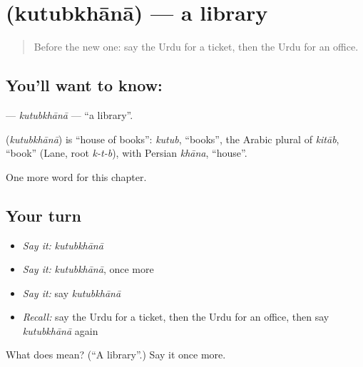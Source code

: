 \section[\texorpdfstring{\ur{کتب} \ur{خانہ} (kutubkhānā)}{کتب خانہ (kutubkhānā)}]{  (kutubkhānā) — a library}

\label{lesson:UR-C102-kutubkhana}



\begin{quote}
Before the new one: say the Urdu for a ticket, then the Urdu for an office.
\end{quote}

\subsection*{You'll want to know:  }
\textbf{ } — \emph{kutubkhānā} — \textquotedblleft{}a library\textquotedblright{}.

\begin{cousinweb}
\textbf{ } (\emph{kutubkhānā}) is \textquotedblleft{}house of books\textquotedblright{}: \emph{kutub}, \textquotedblleft{}books\textquotedblright{}, the Arabic plural of \emph{kitāb}, \textquotedblleft{}book\textquotedblright{} (Lane, root \emph{k-t-b}), with Persian \emph{khāna}, \textquotedblleft{}house\textquotedblright{}.
\end{cousinweb}

\begin{grammarlens}[title={What you've built}]
One more word for this chapter.
\end{grammarlens}

\subsection*{Your turn}
\begin{itemize}
\raggedright
  \item \emph{Say it:} \emph{kutubkhānā}
  \item \emph{Say it:} \emph{kutubkhānā}, once more
  \item \emph{Say it:} say \emph{kutubkhānā}
  \item \emph{Recall:} say the Urdu for a ticket, then the Urdu for an office, then say \emph{kutubkhānā} again
\end{itemize}

\begin{tcolorbox}[breakable,colback=teal!4,colframe=teal!35!black,title={Before you move on}]
What does   mean? (\textquotedblleft{}A library\textquotedblright{}.) Say it once more.
\end{tcolorbox}
